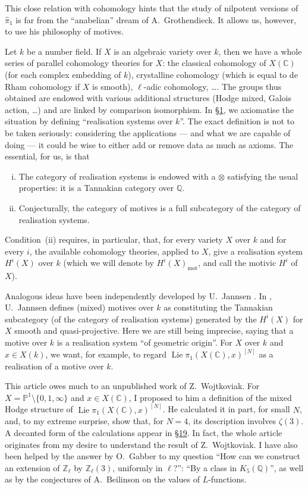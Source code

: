 \documentclass{article}
\theoremstyle{definition}
\newcommand{\mot}{\mathrm{mot}}
\newcommand{\bb}{\mathbb}
\newcommand{\PP}{\bb{P}}
\newcommand{\ZZ}{\bb{Z}}
\newcommand{\CC}{\bb{C}}
\newcommand{\QQ}{\bb{Q}}
\DeclareMathOperator{\Lie}{Lie}
\newcommand{\oldpage}[1]{\marginpar{\footnotesize$\Big\vert$ \textit{p.~#1}}}
\begin{document}
This close relation with cohomology hints that the study of nilpotent versions of $\hat{\pi}_1$ is far from the ``anabelian'' dream of A.~Grothendieck.
It allows us, however, to use his philosophy of motives.

Let $k$ be a number field.
If $X$ is an algebraic variety over $k$, then we have a whole series of parallel cohomology theories for $X$: the classical cohomology of $X(\CC)$ (for each complex embedding of $k$), crystalline cohomology (which is equal to de Rham cohomology if $X$ is smooth), $\ell$-adic cohomology, \ldots.
The groups thus obtained are endowed with various additional structures (Hodge mixed, Galois action, \ldots) and are linked by comparison isomorphism.
In \hyperref[1]{\S1}, we axiomatise the situation by defining ``realisation systems over $k$''.
The exact definition is not to be taken seriously: considering the applications --- and what we are capable of doing --- it could be wise to either add or remove data as much as axioms.
The essential, for us, is that
\begin{enumerate}[(i)]
  \item The category of realisation systems is endowed with a $\otimes$ satisfying the usual properties: it is a Tannakian category over $\QQ$.
  \item Conjecturally, the category of motives is a full subcategory of the category of realisation systems.
\end{enumerate}

Condition~(ii) requires, in particular, that, for every variety $X$ over $k$ and for every $i$, the available cohomology theories, applied to $X$, give a realisation system $H^i(X)$ over $k$ (which we will denote by $H^i(X)_\mot$, and call the motivic $H^i$ of $X$).

Analogous ideas have been independently developed by U.~Jannsen \cite{J}.
In \cite{J}, U.~Jannsen defines (mixed) motives over $k$ as constituting the Tannakian subcategory (of the category of realisation systems) generated by the $H^i(X)$ for $X$ smooth and quasi-projective.
Here we are still being imprecise, saying that a motive over $k$ is a realisation system ``of geometric origin''.
For $X$ over $k$ and $x\in X(k)$, we want, for example, to regard $\Lie\pi_1(X(\CC),x)^{[N]}$ as a realisation of a motive over $k$.

This article owes much to an unpublished work of Z.~Wojtkoviak.
For $X=\PP^1\setminus\{0,1,\infty\}$ and $x\in X(\CC)$, I proposed to him a definition of the mixed Hodge structure of $\Lie\pi_1(X(\CC),x)^{[N]}$.
He calculated it in part, for small $N$, and, to my extreme surprise, show that, for $N=4$, its description involves $\zeta(3)$.
A decanted form of the calculations appear in \hyperref[19]{\S19}.
In fact, the whole article originates from my desire to
\oldpage{83}
understand the result of Z.~Wojtkoviak.
I have also been helped by the answer by O.~Gabber to my question ``How can we construct an extension of $\ZZ_\ell$ by $\ZZ_\ell(3)$, uniformly in $\ell$?'': ``By a class in $K_5(\QQ)$'', as well as by the conjectures of A.~Beilinson on the values of $L$-functions.
\end{document}
